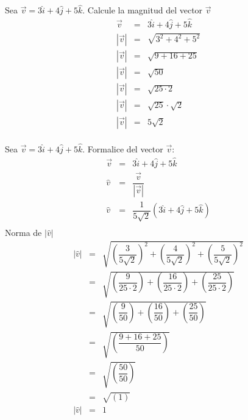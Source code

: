 \begin{myexample}
Sea $\vec{v}=3\hat{i}+4\hat{j}+5\hat{k}$. Calcule la magnitud del vector $\vec{v}$
\begin{eqnarray*}
\vec{v}&=&3\hat{i}+4\hat{j}+5\hat{k}\\
|\vec{v}|&=&\sqrt{3^{2}+4^{2}+5^{2}}\\
|\vec{v}|&=&\sqrt{9+16+25}\\
|\vec{v}|&=&\sqrt{50}\\
|\vec{v}|&=&\sqrt{25\cdot 2}\\
|\vec{v}|&=&\sqrt{25}\cdot \sqrt{2}\\
|\vec{v}|&=&5\sqrt{2}\\
\end{eqnarray*}
\end{myexample}

\begin{myexample}
Sea $\vec{v}=3\hat{i}+4\hat{j}+5\hat{k}$. Formalice del vector $\vec{v}$:
\begin{eqnarray*}
\vec{v}&=&3\hat{i}+4\hat{j}+5\hat{k}\\
\hat{v}&=&\dfrac{\vec{v}}{|\vec{v}|}\\
\hat{v}&=&\dfrac{1}{5\sqrt{2}}\left( 3\hat{i}+4\hat{j}+5\hat{k}\right)\\
\end{eqnarray*}
Norma de $|\hat{v}|$
\begin{eqnarray*}
|\hat{v}|&=&\sqrt{\left(\dfrac{3}{5\sqrt{2}}\right)^{2}+\left(\dfrac{4}{5\sqrt{2}}\right)^{2}+\left(\dfrac{5}{5\sqrt{2}}\right)^{2}}\\
&=&\sqrt{\left(\dfrac{9}{25\cdot 2}\right)+\left(\dfrac{16}{25\cdot 2}\right)+\left(\dfrac{25}{25\cdot 2}\right)}\\
&=&\sqrt{\left(\dfrac{9}{50}\right)+\left(\dfrac{16}{50}\right)+\left(\dfrac{25}{50}\right)}\\
&=&\sqrt{\left(\dfrac{9+16+25}{50}\right)}\\
&=&\sqrt{\left(\dfrac{50}{50}\right)}\\
&=&\sqrt{\left(1\right)}\\
|\hat{v}|&=&1\\
\end{eqnarray*}
\end{myexample}



